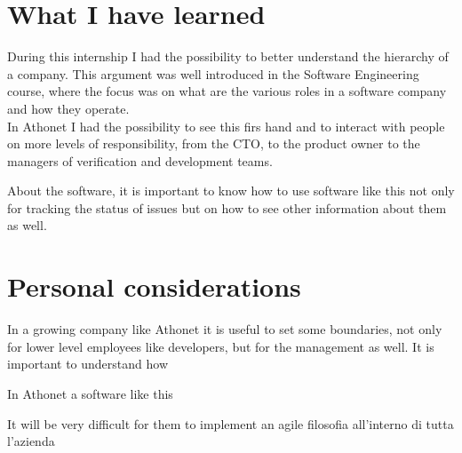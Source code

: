 \section{What I have learned}

	During this internship I had the possibility to better understand the hierarchy of a company.
	This argument was well introduced in the Software Engineering course, where the focus was on what are the various roles in a software company and how they operate.\\
	In Athonet I had the possibility to see this firs hand and to interact with people on more levels of responsibility, from the CTO, to the product owner to the managers of verification and development teams.
	
	About the software, it is important to know how to use software like this not only for tracking the status of issues but on how to see other information about them as well.
	
	
	

\section{Personal considerations}

	In a growing company like Athonet it is useful to set some boundaries, not only for lower level employees like developers, but for the management as well.
	It is important to understand how 
	
	
	In Athonet a software like this 
	
	It will be very difficult for them to implement an agile filosofia all'interno di tutta l'azienda

	


